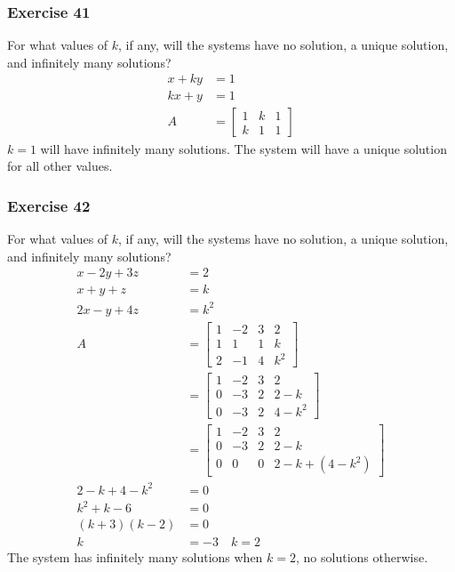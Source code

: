 \documentclass[letterpaper, 12pt]{math}
\begin{document}
\subsubsection*{Exercise 41}
For what values of \( k \), if any, will the systems have no solution, a unique
solution, and infinitely many solutions?
\begin{align*}
  x+ky &= 1 \\
  kx+y &= 1 \\
  A &= \begin{bmatrix}
    1 & k & 1 \\
    k & 1 & 1
  \end{bmatrix}
\end{align*}
\( k = 1 \) will have infinitely many solutions. The system will have a unique
solution for all other values.

\subsubsection*{Exercise 42}
For what values of \( k \), if any, will the systems have no solution, a unique
solution, and infinitely many solutions?
\begin{align*}
  x-2y+3z &= 2 \\
  x+y+z &= k \\
  2x-y+4z &= k^2 \\
  A &= \begin{bmatrix}
    1 & -2 & 3 & 2 \\
    1 & 1 & 1 & k \\
    2 & -1 & 4 & k^2
  \end{bmatrix} \\
  &= \begin{bmatrix}
    1 & -2 & 3 & 2 \\
    0 & -3 & 2 & 2-k \\
    0 & -3 & 2 & 4-k^2
  \end{bmatrix} \\
  &= \begin{bmatrix}
    1 & -2 & 3 & 2 \\
    0 & -3 & 2 & 2-k \\
    0 & 0 & 0 & 2-k+(4-k^2)
  \end{bmatrix} \\
  2-k+4-k^2 &= 0 \\
  k^2+k-6 &= 0 \\
  (k+3)(k-2) &= 0 \\
  k &= -3 \quad k = 2
\end{align*}
The system has infinitely many solutions when \( k = 2 \), no solutions
otherwise.
\end{document}
